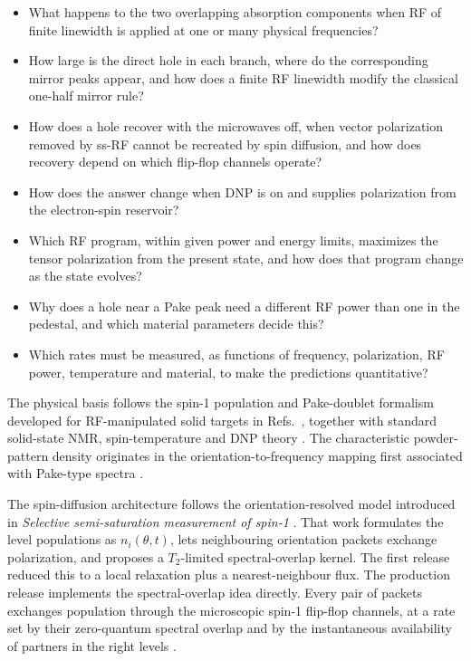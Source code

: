 \documentclass[11pt]{article}
\begin{document}
\begin{itemize}
  \item What happens to the two overlapping absorption components when RF of finite linewidth is applied at one or many physical frequencies?
  \item How large is the direct hole in each branch, where do the corresponding mirror peaks appear, and how does a finite RF linewidth modify the classical one-half mirror rule?
  \item How does a hole recover with the microwaves off, when vector polarization removed by ss-RF cannot be recreated by spin diffusion, and how does recovery depend on which flip-flop channels operate?
  \item How does the answer change when DNP is on and supplies polarization from the electron-spin reservoir?
  \item Which RF program, within given power and energy limits, maximizes the tensor polarization from the present state, and how does that program change as the state evolves?
  \item Why does a hole near a Pake peak need a different RF power than one in the pedestal, and which material parameters decide this?
  \item Which rates must be measured, as functions of frequency, polarization, RF power, temperature and material, to make the predictions quantitative?
\end{itemize}

The physical basis follows the spin-1 population and Pake-doublet formalism developed for
RF-manipulated solid targets in Refs.~\cite{ClementKeller2023,Keller2026,KellerCrabbDay2020,Keller2017},
together with standard solid-state NMR, spin-temperature and DNP theory
\cite{Abragam1961,Slichter1990,Wasylishen2012,Goldman1970,AbragamGoldman1978,AbragamGoldman1982}.
The characteristic powder-pattern density originates in the orientation-to-frequency mapping
first associated with Pake-type spectra \cite{Pake1948}.

The spin-diffusion architecture follows the orientation-resolved model introduced in
\emph{Selective semi-saturation measurement of spin-1} \cite{Keller2026}. That work formulates
the level populations as \(n_i(\theta,t)\), lets neighbouring orientation packets exchange
polarization, and proposes a \(T_2\)-limited spectral-overlap kernel. The first release reduced
this to a local relaxation plus a nearest-neighbour flux. The production release implements the
spectral-overlap idea directly. Every pair of packets exchanges population through the
microscopic spin-1 flip-flop channels, at a rate set by their zero-quantum spectral overlap and
by the instantaneous availability of partners in the right levels \cite{SuterErnst1985,Khutsishvili1966,Eckman1982}.
\end{document}
